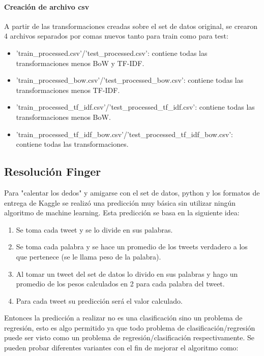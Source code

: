 \documentclass[12pt]{article}
\begin{document}
\paragraph{Creación de archivo csv\\}
A partir de las transformaciones creadas sobre el set de datos original, se crearon 4 archivos separados por comas nuevos tanto para train como para test:

\begin{itemize}
  \item 'train\_processed.csv'/'test\_processed.csv': contiene todas las transformaciones menos BoW y TF-IDF.
  \item 'train\_processed\_bow.csv'/'test\_processed\_bow.csv': contiene todas las transformaciones menos TF-IDF.
  \item 'train\_processed\_tf\_idf.csv'/'test\_processed\_tf\_idf.csv': contiene todas las transformaciones menos BoW.
  \item 'train\_processed\_tf\_idf\_bow.csv'/'test\_processed\_tf\_idf\_bow.csv': contiene todas las transformaciones.
\end{itemize}


\newpage
\subsection{Resolución Finger}
Para "calentar los dedos" y amigarse con el set de datos, python y los formatos de entrega de Kaggle se realizó una predicción muy básica sin utilizar ningún algoritmo de machine learning.
Esta predicción se basa en la siguiente idea: 

\begin{enumerate}
  \item Se toma cada tweet y se lo divide en sus palabras.
  \item Se toma cada palabra y se hace un promedio de los tweets verdadero a los que pertenece (se le llama peso de la palabra).
  \item Al tomar un tweet del set de datos lo divido en sus palabras y hago un promedio de los pesos calculados en 2 para cada palabra del tweet.
  \item Para cada tweet su predicción será el valor calculado.
\end{enumerate}

Entonces la predicción a realizar no es una clasificación sino un problema de regresión, esto es algo permitido ya que todo problema de clasificación/regresión puede ser visto como un problema de regresión/clasificación respectivamente.
Se pueden probar diferentes variantes  con el fin de mejorar el algoritmo como:
\end{document}
